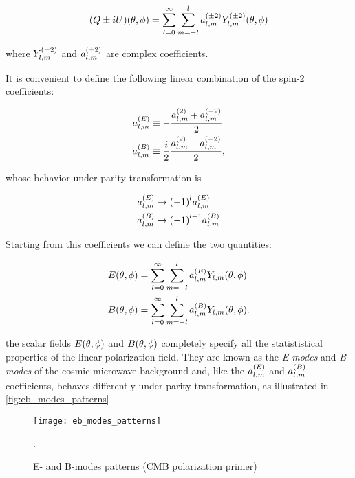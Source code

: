 \begin{equation}
        (Q \pm iU)\qty(\theta,\phi) = \sum^\infty_{l=0}\sum^l_{m=-l}
        a^{\qty(\pm 2)}_{l,m} Y^{\qty(\pm 2)}_{l,m}\qty(\theta,\phi)
\end{equation}

where $Y^{\qty(\pm 2)}_{l,m}$ and $a^{\qty(\pm 2)}_{l,m}$ are complex
coefficients.

It is convenient to define the following linear combination of the spin-2
coefficients:

\begin{align}
        a^{\qty(E)}_{l,m} & \equiv -\frac{a^{\qty(2)}_{l,m} + a^{\qty(-2)}_{l,m}}
        {2} \\
        a^{\qty(B)}_{l,m} & \equiv \frac{i}{2}
        \frac{a^{\qty(2)}_{l,m} - a^{\qty(-2)}_{l,m}}{2},
\end{align}

whose behavior under parity transformation is

\begin{align}
        a^{\qty(E)}_{l,m} & \rightarrow \qty(-1)^l a^{\qty(E)}_{l,m} \\
        a^{\qty(B)}_{l,m} & \rightarrow \qty(-1)^{l + 1} a^{\qty(B)}_{l,m}
\end{align}

Starting from this coefficients we can define the two quantities:

\begin{align}
        E\qty(\theta,\phi) & = \sum^\infty_{l=0}\sum^l_{m=-l}
        a^{\qty(E)}_{l,m} Y_{l,m}\qty(\theta,\phi) \\
        B\qty(\theta,\phi) & = \sum^\infty_{l=0}\sum^l_{m=-l}
        a^{\qty(B)}_{l,m} Y_{l,m}\qty(\theta,\phi).
\end{align}

the scalar fields $E\qty(\theta,\phi)$ and $B\qty(\theta,\phi)$ completely
specify all the statististical properties of the linear polarization
field. They are known as the \emph{E-modes} and \emph{B-modes} of the
cosmic microwave background and, like the $a^{\qty(E)}_{l,m}$ and
$a^{\qty(B)}_{l,m}$ coefficients, behaves differently under parity
transformation, as illustrated in \autoref{fig:eb_modes_patterns}

\begin{figure}
        \centering
        \texttt{[image: eb\_modes\_patterns]}
        \caption{E- and B-modes patterns (CMB polarization primer)}
        \label{fig:eb_modes_patterns}.
\end{figure}

